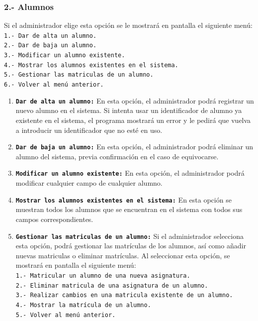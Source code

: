 \documentclass{book}
\begin{document}
\subsubsection{2.- Alumnos}{
Si el administrador elige esta opción se le mostrará en pantalla el siguiente menú:\\
\texttt{1.- Dar de alta un alumno.}\\
\texttt{2.- Dar de baja un alumno.}\\
\texttt{3.- Modificar un alumno existente.}\\
\texttt{4.- Mostrar los alumnos existentes en el sistema.}\\
\texttt{5.- Gestionar las matriculas de un alumno.}\\
\texttt{6.- Volver al menú anterior.}
\begin{enumerate}
	\item \textbf{\texttt{Dar de alta un alumno:}} En esta opción, el administrador podrá registrar un nuevo alumno en el sistema. Si intenta usar un identificador de alumno ya existente en el sistema, el programa mostrará un error y le pedirá que vuelva a introducir un identificador que no esté en uso.
	\item \textbf{\texttt{Dar de baja un alumno:}} En esta opción, el administrador podrá eliminar un alumno del sistema, previa confirmación en el caso de equivocarse.
	\item \textbf{\texttt{Modificar un alumno existente:}} En esta opción, el administrador podrá modificar cualquier campo de cualquier alumno.
	\item \textbf{\texttt{Mostrar los alumnos existentes en el sistema:}} En esta opción se muestran todos los alumnos que se encuentran en el sistema con todos sus campos correspondientes.
	\item \textbf{\texttt{Gestionar las matriculas de un alumno:}} Si el administrador selecciona esta opción, podrá gestionar las matrículas de los alumnos, así como añadir nuevas matriculas o eliminar matrículas. Al seleccionar esta opción, se mostrará en pantalla el siguiente menú:\\
	\texttt{1.- Matricular un alumno de una nueva asignatura.}\\
	\texttt{2.- Eliminar matricula de una asignatura de un alumno.}\\
	\texttt{3.- Realizar cambios en una matricula existente de un alumno.}\\
	\texttt{4.- Mostrar la matrícula de un alumno.}\\
	\texttt{5.- Volver al menú anterior.}

\end{enumerate}}
\end{document}

